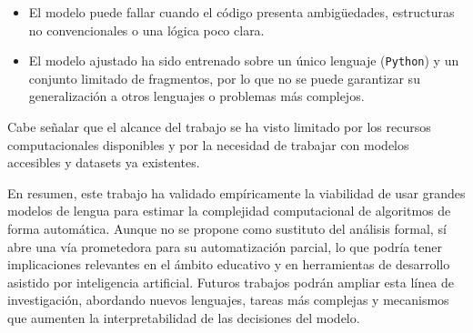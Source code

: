 \documentclass[12pt,twoside]{article}
\begin{document}
\begin{itemize}
    \item El modelo puede fallar cuando el código presenta ambigüedades, estructuras no convencionales o una lógica poco clara.
    \item El modelo ajustado ha sido entrenado sobre un único lenguaje (\texttt{Python}) y un conjunto limitado de fragmentos, por lo que no se puede garantizar su generalización a otros lenguajes o problemas más complejos.
\end{itemize}

Cabe señalar que el alcance del trabajo se ha visto limitado por los recursos computacionales disponibles y por la necesidad de trabajar con modelos accesibles y datasets ya existentes.

En resumen, este trabajo ha validado empíricamente la viabilidad de usar grandes modelos de lengua para estimar la complejidad computacional de algoritmos de forma automática. Aunque no se propone como sustituto del análisis formal, sí abre una vía prometedora para su automatización parcial, lo que podría tener implicaciones relevantes en el ámbito educativo y en herramientas de desarrollo asistido por inteligencia artificial. Futuros trabajos podrán ampliar esta línea de investigación, abordando nuevos lenguajes, tareas más complejas y mecanismos que aumenten la interpretabilidad de las decisiones del modelo.
\end{document}

